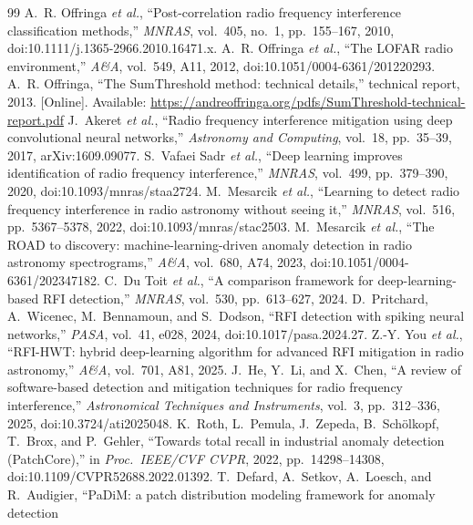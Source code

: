 \documentclass[journal]{IEEEtran}
\begin{document}
\begin{thebibliography}{99}
 A.~R. Offringa \emph{et al.}, ``Post-correlation
radio frequency interference classification methods,'' \emph{MNRAS},
vol.~405, no.~1, pp.~155--167, 2010, doi:10.1111/j.1365-2966.2010.16471.x.
 A.~R. Offringa \emph{et al.}, ``The LOFAR radio
environment,'' \emph{A\&A}, vol.~549, A11, 2012, doi:10.1051/0004-6361/201220293.
 A.~R. Offringa, ``The SumThreshold method: technical
details,'' technical report, 2013. [Online]. Available:
\url{https://andreoffringa.org/pdfs/SumThreshold-technical-report.pdf}
 J.~Akeret \emph{et al.}, ``Radio frequency interference
mitigation using deep convolutional neural networks,'' \emph{Astronomy and
Computing}, vol.~18, pp.~35--39, 2017, arXiv:1609.09077.
 S.~Vafaei Sadr \emph{et al.}, ``Deep learning
improves identification of radio frequency interference,'' \emph{MNRAS},
vol.~499, pp.~379--390, 2020, doi:10.1093/mnras/staa2724.
 M.~Mesarcik \emph{et al.}, ``Learning to detect
radio frequency interference in radio astronomy without seeing it,''
\emph{MNRAS}, vol.~516, pp.~5367--5378, 2022, doi:10.1093/mnras/stac2503.
 M.~Mesarcik \emph{et al.}, ``The ROAD to discovery:
machine-learning-driven anomaly detection in radio astronomy
spectrograms,'' \emph{A\&A}, vol.~680, A74, 2023,
doi:10.1051/0004-6361/202347182.
 C.~Du Toit \emph{et al.}, ``A comparison framework for
deep-learning-based RFI detection,'' \emph{MNRAS}, vol.~530, pp.~613--627,
2024.
 D.~Pritchard, A.~Wicenec, M.~Bennamoun, and
S.~Dodson, ``RFI detection with spiking neural networks,'' \emph{PASA},
vol.~41, e028, 2024, doi:10.1017/pasa.2024.27.
 Z.-Y. You \emph{et al.}, ``RFI-HWT: hybrid deep-learning
algorithm for advanced RFI mitigation in radio astronomy,'' \emph{A\&A},
vol.~701, A81, 2025.
 J.~He, Y.~Li, and X.~Chen, ``A review of software-based
detection and mitigation techniques for radio frequency interference,''
\emph{Astronomical Techniques and Instruments}, vol.~3, pp.~312--336, 2025,
doi:10.3724/ati2025048.
 K.~Roth, L.~Pemula, J.~Zepeda, B.~Sch\"olkopf,
T.~Brox, and P.~Gehler, ``Towards total recall in industrial anomaly
detection (PatchCore),'' in \emph{Proc.~IEEE/CVF CVPR}, 2022, pp.~14298--14308,
doi:10.1109/CVPR52688.2022.01392.
 T.~Defard, A.~Setkov, A.~Loesch, and R.~Audigier,
``PaDiM: a patch distribution modeling framework for anomaly detection

\end{thebibliography}
\end{document}
